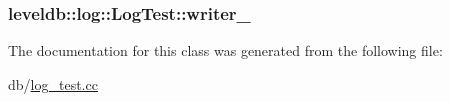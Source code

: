 \subsubsection[{writer\+\_\+}]{ leveldb\+::log\+::\+Log\+Test\+::writer\+\_\+\hspace{0.3cm}{\ttfamily [private]}}\label{classleveldb_1_1log_1_1_log_test_a8b219478ee3bf6a34802c4ebca6fae6d}


The documentation for this class was generated from the following file\+:\begin{DoxyCompactItemize}
\item 
db/\hyperlink{log__test_8cc}{log\+\_\+test.\+cc}\end{DoxyCompactItemize}
